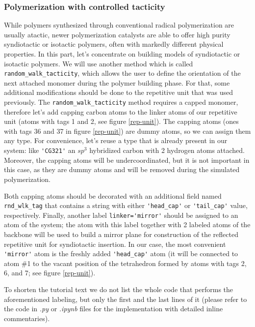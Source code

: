 \documentclass[9pt,tutorial]{livecoms}
\begin{document}
\subsubsection{Polymerization with controlled tacticity}
While polymers synthesized through conventional radical polymerization are usually atactic, newer polymerization catalysts are able to offer high purity syndiotactic or isotactic polymers, often with markedly different physical properties. In this part, let's concentrate on building models of syndiotactic or isotactic polymers. We will use another method which is called \lstinline$random_walk_tacticity$, which allows the user to define the orientation of the next attached monomer during the polymer building phase. For that, some additional modifications should be done to the repetitive unit that was used previously. The \lstinline$random_walk_tacticity$ method requires a capped monomer, therefore let's add capping carbon atoms to the linker atoms of our repetitive unit (atoms with tags 1 and 2, see figure \ref{rep-unit}). The capping atoms (ones with tags 36 and 37 in figure \ref{rep-unit}) are dummy atoms, so we can assign them any type. For convenience, let's reuse a type that is already present in our system: like \lstinline$'CG321'$ an $sp^3$ hybridized carbon with 2 hydrogen atoms attached. Moreover, the capping atoms will be undercoordinated, but it is not important in this case, as they are dummy atoms and will be removed during the simulated polymerization.

Both capping atoms should be decorated with an additional field named \lstinline$rnd_wlk_tag$ that contains a string with either \lstinline$'head_cap'$ or \lstinline$'tail_cap'$ value, respectively. Finally, another label \lstinline$linker='mirror'$ should be assigned to an atom of the system; the atom with this label together with 2 labeled atoms of the backbone will be used to build a mirror plane for construction of the reflected repetitive unit for syndiotactic insertion. In our case, the most convenient \lstinline$'mirror'$ atom is the freshly added \lstinline$'head_cap'$ atom (it will be connected to atom \#1 to the vacant position of the tetrahedron formed by atoms with tags 2, 6, and 7; see figure \ref{rep-unit}).

To shorten the tutorial text we do not list the whole code that performs the aforementioned labeling, but only the first and the last lines of it (please refer to the code in \textit{.py} or \textit{.ipynb} files for the implementation with detailed inline commentaries).
\end{document}
